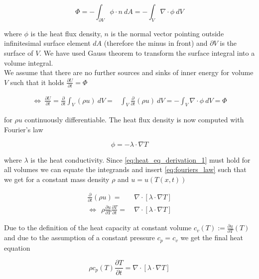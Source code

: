 \documentclass{scrartcl}[12pt, halfparskip]
\numberwithin{equation}{section}
\numberwithin{figure}{section}
\numberwithin{table}{section}
\begin{document}
\begin{equation}
	\varPhi = - \int_{\partial V} \phi \cdot n \ dA = - \int_{V} \nabla \cdot \phi \ dV
\end{equation}

where $\phi$ is the heat flux density, $n$ is the normal vector pointing outside infinitesimal surface element $dA$ (therefore the minus in front) and $\partial V$ is the surface of $V$. We have used Gauss theorem to transform the surface integral into a volume integral. \\
We assume that there are no further sources and sinks of inner energy for volume $V$ such that it holds $\frac{\partial U}{\partial t} = \varPhi$

\begin{align}
	\Leftrightarrow \ \frac{\partial U}{\partial t} = \frac{\partial}{\partial t} \int_V (\rho u) \ dV = & \int_V \frac{\partial}{\partial t}(\rho u) \ dV = - \int_{V} \nabla \cdot \phi \ dV = \varPhi
	\label{eq:heat_eq_derivation_1}
\end{align}

for $\rho u$ continuously differentiable. The heat flux density is now computed with Fourier's law

\begin{equation}
	\phi = - \lambda \cdot \nabla T
	\label{eq:fouriers_law}
\end{equation}

where $\lambda$ is the heat conductivity. Since \cref{eq:heat_eq_derivation_1} must hold for all volumes we can equate the integrands and insert \cref{eq:fouriers_law} such that we get for a constant mass density $\rho$ and $u = u(T(x,t))$

\begin{align}
	\frac{\partial}{\partial t}(\rho u) = & \ \nabla \cdot \left[ \lambda \cdot \nabla T \right] \\
	\Leftrightarrow \ \ \rho \frac{\partial u}{\partial T} \frac{\partial T}{\partial t} = & \ \nabla \cdot \left[ \lambda \cdot \nabla T \right]
\end{align}

Due to the definition of the heat capacity at constant volume $c_v(T) := \frac{\partial u}{\partial T}(T)$ and due to the assumption of a constant pressure $c_p = c_v$ we get the final heat equation

\enlargethispage{3\baselineskip}

\begin{equation}
	\rho c_p(T) \frac{\partial T}{\partial t} = \nabla \cdot \left[ \lambda \cdot \nabla T \right]
	\label{eq:heat_equation_derivation}
\end{equation}
\end{document}
